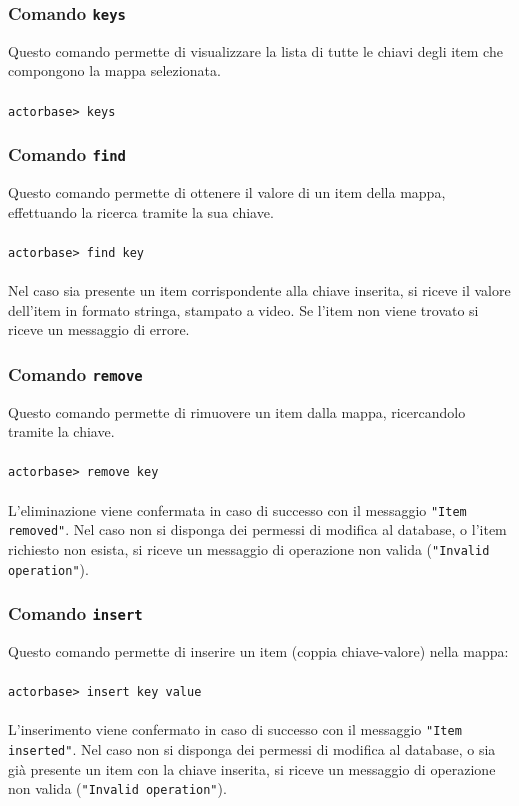 \documentclass[a4paper]{article}
\begin{document}
	\subsubsection{Comando \texttt{keys}}
	Questo comando permette di visualizzare la lista di tutte le chiavi degli item che compongono la mappa selezionata.
	\\ \\
	\texttt{actorbase>	keys}

	\subsubsection{Comando \texttt{find}}
	Questo comando permette di ottenere il valore di un item della mappa, effettuando la ricerca tramite la sua chiave.
	\\ \\
	\texttt{actorbase>	find key}
	\\ \\
	Nel caso sia presente un item corrispondente alla chiave inserita, si riceve il valore dell'item in formato stringa, stampato a video. Se l'item non viene trovato si riceve un messaggio di errore.
	\subsubsection{Comando \texttt{remove}}
	Questo comando permette di rimuovere un item dalla mappa, ricercandolo tramite la chiave.
	\\ \\
	\texttt{actorbase>	remove key}
	\\ \\
	L'eliminazione viene confermata in caso di successo con il messaggio \texttt{"Item removed"}. Nel caso non si disponga dei permessi di modifica al database, o l'item 
	richiesto non esista, si riceve un messaggio di operazione non valida (\texttt{"Invalid operation"}).

	\subsubsection{Comando \texttt{insert}}
	Questo comando permette di inserire un item (coppia chiave-valore) nella mappa:
	\\ \\
	\texttt{actorbase>	insert key value}
	\\ \\
	L'inserimento viene confermato in caso di successo con il messaggio \texttt{"Item inserted"}. Nel caso non si disponga dei permessi di modifica al database, o sia già presente un item con la chiave inserita, si riceve un messaggio di operazione non valida (\texttt{"Invalid operation"}).
	
\end{document}
